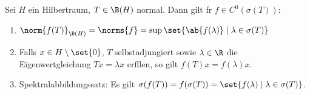 	\begin{theorem}\label{eigenschaften_stetiger_kalkuel}
		Sei $H$ ein Hilbertraum, \(T\in \B(H)\) normal.  Dann gilt f\us r \(f\in C^0(\sigma(T))\):
		\begin{enumerate}
			\item \(\norm{f(T)}_{\B(H)} = \norms{f} = \sup\set{\ab{f(\lambda)}\;\vert\;\lambda \in \sigma(T)}\) \label{eigenschaften_stetiger_kalkuel_1}
			\item Falls \(x\in H\setminus\set{0}\), \(T\) selbstadjungiert sowie \(\lambda \in \R\) die Eigenwertgleichung \(Tx = \lambda x\) erf\us llen, so gilt \(f(T)x = f(\lambda)x\)\;.
			\item Spektralabbildungssatz: Es gilt \(\sigma(f(T)) = f(\sigma(T)) = \set{f(\lambda)\;\vert\;\lambda \in \sigma(T)}\).
		\end{enumerate}
	\end{theorem}
